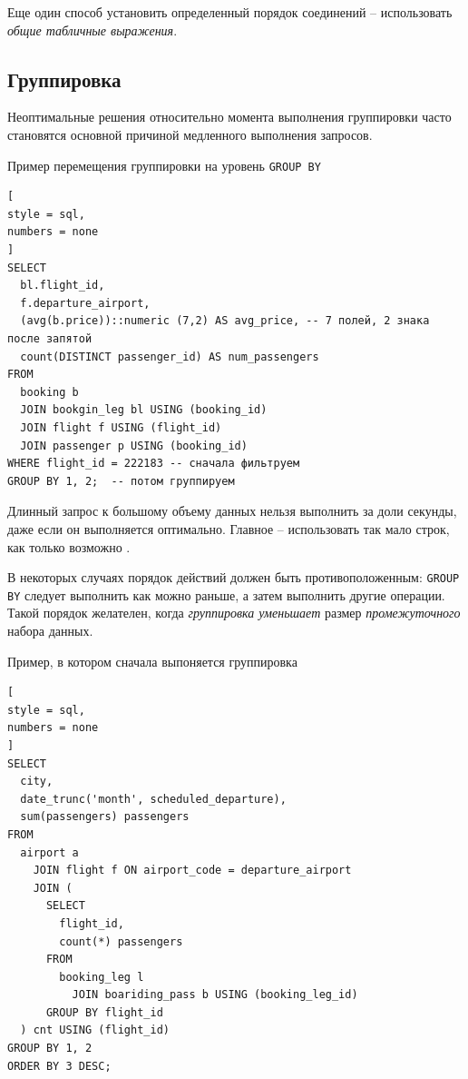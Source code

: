 \documentclass[%
	11pt,
	a4paper,
	utf8,
		]{article}
\begin{document}
Еще один способ установить определенный порядок соединений -- использовать \emph{общие табличные выражения}.

\subsection{Группировка}

Неоптимальные решения относительно момента выполнения группировки часто становятся основной причиной медленного выполнения запросов.

Пример перемещения группировки на уровень \verb|GROUP BY|
\begin{lstlisting}[
style = sql,
numbers = none
]
SELECT
  bl.flight_id,
  f.departure_airport,
  (avg(b.price))::numeric (7,2) AS avg_price, -- 7 полей, 2 знака после запятой
  count(DISTINCT passenger_id) AS num_passengers
FROM
  booking b
  JOIN bookgin_leg bl USING (booking_id)
  JOIN flight f USING (flight_id)
  JOIN passenger p USING (booking_id)
WHERE flight_id = 222183 -- сначала фильтруем
GROUP BY 1, 2;  -- потом группируем
\end{lstlisting}


Длинный запрос к большому объему данных нельзя выполнить за доли секунды, даже если он выполняется оптимально. Главное -- использовать так мало строк, как только возможно \cite[]{dombrovskaya:postgresql-2022}.

В некоторых случаях порядок действий должен быть противоположенным: \verb|GROUP BY| следует выполнить как можно раньше, а затем выполнить другие операции. Такой порядок желателен, когда \emph{группировка уменьшает} размер \emph{промежуточного} набора данных.

Пример, в котором сначала выпоняется группировка
\begin{lstlisting}[
style = sql,
numbers = none	
]
SELECT
  city,
  date_trunc('month', scheduled_departure),
  sum(passengers) passengers
FROM
  airport a
    JOIN flight f ON airport_code = departure_airport
    JOIN (
      SELECT
        flight_id,
        count(*) passengers
      FROM
        booking_leg l
          JOIN boariding_pass b USING (booking_leg_id)
      GROUP BY flight_id 
  ) cnt USING (flight_id)
GROUP BY 1, 2
ORDER BY 3 DESC;
\end{lstlisting}
\end{document}
